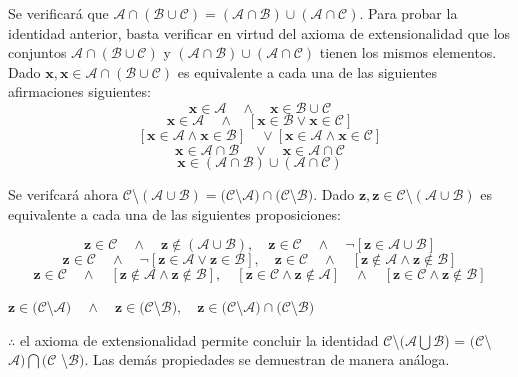 \begin{proof2}
Se verificará que  $\mathcal{A} \cap (\mathcal{B} \cup \mathcal{C}) = (\mathcal{A} \cap \mathcal{B}) \cup (\mathcal{A} \cap \mathcal{C})$. Para probar la identidad anterior,
basta verificar en virtud del axioma de extensionalidad que los conjuntos  $\mathcal{A} \cap (\mathcal{B} \cup \mathcal{C})$ y $(\mathcal{A} \cap \mathcal{B}) \cup (\mathcal{A} \cap \mathcal{C})$ tienen los mismos elementos. \\ 

Dado $\mathbf{x}, \mathbf{x} \in \mathcal{A} \cap (\mathcal{B} \cup \mathcal{C})$ es equivalente a cada una de las siguientes afirmaciones siguientes: 
	\[ \mathbf{x} \in \mathcal{A} \quad \wedge \quad \mathbf{x} \in \mathcal{B} \cup \mathcal{C} \]
	\[ \mathbf{x} \in \mathcal{A} \quad \wedge \quad [ \mathbf{x}\in\mathcal{B} \vee \mathbf{x}\in\mathcal{C}  ]\]
	\[ [\mathbf{x}\in\mathcal{A} \wedge \mathbf{x}\in\mathcal{B}] \quad \vee [\mathbf{x}\in\mathcal{A} \wedge \mathbf{x}\in\mathcal{C}]\]
	\[ \mathbf{x}\in\mathcal{A}\cap\mathcal{B} \quad \vee \quad \mathbf{x}\in\mathcal{A}\cap\mathcal{C}\]
	\[ \mathbf{x} \in (\mathcal{A}\cap\mathcal{B})\cup(\mathcal{A}\cap\mathcal{C})\]

Se verifcará ahora $\mathcal{C}$\textbackslash$(\mathcal{A}\cup\mathcal{B}) = (\mathcal{C}$\textbackslash$\mathcal{A})\cap(\mathcal{C}$\textbackslash$\mathcal{B})$. Dado $\mathbf{z}, \mathbf{z}\in\mathcal{C}$\textbackslash$(\mathcal{A}\cup\mathcal{B})$ es equivalente a cada una de las siguientes proposiciones: 

\[ \mathbf{z}\in\mathcal{C} \quad \wedge \quad \mathbf{z}\notin(\mathcal{A}\cup\mathcal{B}), \quad \mathbf{z}\in\mathcal{C} \quad \wedge \quad \neg[\mathbf{z}\in \mathcal{A}\cup\mathcal{B}]\]
\[\mathbf{z}\in\mathcal{C} \quad \wedge \quad \neg[\mathbf{z}\in\mathcal{A} \vee \mathbf{z}\in\mathcal{B}], \quad \mathbf{z}\in\mathcal{C} \quad \wedge\quad [\mathbf{z}\notin\mathcal{A} \wedge \mathbf{z}\notin\mathcal{B}]\]
\[\mathbf{z}\in\mathcal{C} \quad \wedge \quad [\mathbf{z}\notin\mathcal{A} \wedge \mathbf{z}\notin\mathcal{B}], \quad [\mathbf{z}\in\mathcal{C} \wedge \mathbf{z}\notin\mathcal{A}] \quad \wedge \quad [\mathbf{z}\in\mathcal{C}\wedge\mathbf{z}\notin\mathcal{B}]\] 
\begin{centering}
	$\mathbf{z}\in(\mathcal{C}$\textbackslash$\mathcal{A})\quad\wedge\quad\mathbf{z}\in(\mathcal{C}$\textbackslash$\mathcal{B}), \quad \mathbf{z}\in(\mathcal{C}$\textbackslash$\mathcal{A})\cap(\mathcal{C}$\textbackslash$\mathcal{B})$\\
\end{centering}
$\therefore$ el axioma de extensionalidad permite concluir la identidad $\mathcal{C}$\textbackslash$(\mathcal{A} \bigcup \mathcal{B}$) = $(\mathcal{C}$\textbackslash$\mathcal{A}) \bigcap (\mathcal{C}$ \textbackslash $\mathcal{B})$. Las demás propiedades se demuestran de manera análoga. 
\end{proof2} 

